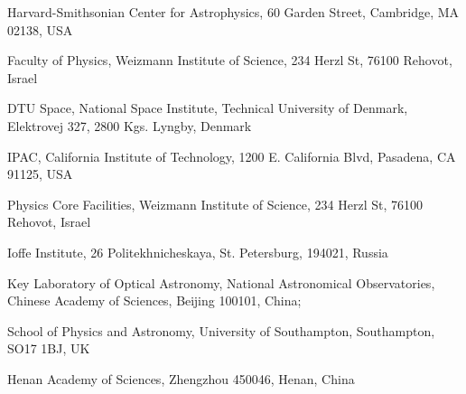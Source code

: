 \documentclass{nature_plusfigure}
\begin{document}
\begin{small}
\begin{affiliations}
\item Harvard-Smithsonian Center for Astrophysics, 60 Garden Street, Cambridge, MA 02138, USA
\item Faculty of Physics, Weizmann Institute of Science, 234 Herzl St, 76100 Rehovot, Israel
\item DTU Space, National Space Institute, Technical University of Denmark, Elektrovej 327, 2800 Kgs. Lyngby, Denmark
\item IPAC, California Institute of Technology, 1200 E. California Blvd, Pasadena, CA 91125, USA
\item Physics Core Facilities, Weizmann Institute of Science, 234 Herzl St, 76100 Rehovot, Israel
\item Ioffe Institute, 26 Politekhnicheskaya, St. Petersburg, 194021, Russia
\item Key Laboratory of Optical Astronomy, National Astronomical Observatories, Chinese Academy of Sciences, Beĳing 100101, China; 
\item School of Physics and Astronomy, University of Southampton, Southampton, SO17 1BJ, UK
\item Henan Academy of Sciences, Zhengzhou 450046, Henan, China

\end{affiliations}
\end{small}
\end{document}
